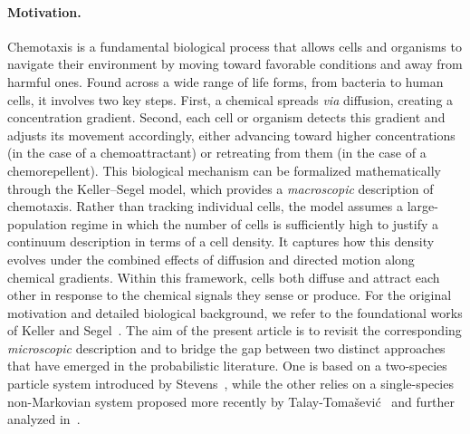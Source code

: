 \documentclass[11pt]{article}
\newcommand{\1}{\mathbbm{1}}
\begin{document}
\paragraph{Motivation.}
Chemotaxis is a fundamental biological process that allows cells and organisms to navigate their environment by moving toward favorable conditions and away from harmful ones. Found across a wide range of life forms, from bacteria to human cells, it involves two key steps. First, a chemical spreads {\it via} diffusion, creating a concentration gradient. Second, each cell or organism detects this gradient and adjusts its movement accordingly, either advancing toward higher concentrations (in the case of a chemoattractant) or retreating from them (in the case of a chemorepellent).
This biological mechanism can be formalized mathematically through the Keller–Segel model, which provides a \textit{macroscopic} description of chemotaxis. Rather than tracking individual cells, the model assumes a large-population regime in which the number of cells is sufficiently high to justify a continuum description in terms of a cell density. It captures how this density evolves under the combined effects of  diffusion and directed motion along chemical gradients. Within this framework, cells both diffuse and attract each other in response to the chemical signals they sense or produce. For the original motivation and detailed biological background, we refer to the foundational works of Keller and Segel~\cite{KELLER_SEGEL1, KELLER_SEGEL2, KELLER_SEGEL3}.
 The aim of the present article is to revisit the corresponding \textit{microscopic} description and to bridge the gap between two distinct approaches that have emerged in the probabilistic literature. One is based on a two-species particle system introduced by Stevens~\cite{Stevens}, while the other relies on a single-species non-Markovian system proposed more recently by Talay-Tomašević~\cite{Mi-De} and further analyzed in~\cite{JTT,tomasevic.these,FT1}.
\end{document}
